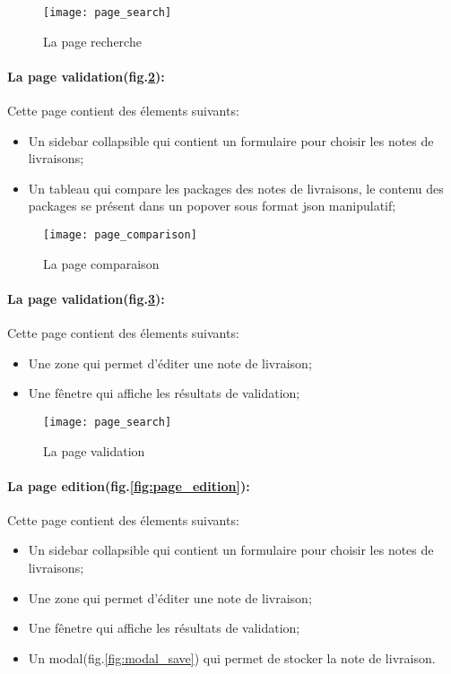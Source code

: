 \begin{figure}[h]
\centering
\texttt{[image: page\_search]}
\caption{La page recherche}
\label{fig:page_search}
\end{figure}

\paragraph{La page validation(fig.\ref{fig:page_comparaison}): } Cette page contient des élements suivants:
\begin{itemize}
  \item Un sidebar collapsible qui contient un formulaire pour choisir les notes de livraisons;
  \item Un tableau qui compare les packages des notes de livraisons, le contenu des packages se présent dans un popover sous format json manipulatif;
\end{itemize}

\begin{figure}[h]
\centering
\texttt{[image: page\_comparison]}
\caption{La page comparaison}
\label{fig:page_comparaison}
\end{figure}

\paragraph{La page validation(fig.\ref{fig:page_validation}): } Cette page contient des élements suivants:
\begin{itemize}
  \item Une zone qui permet d'éditer une note de livraison;
  \item Une fênetre qui affiche les résultats de validation;
\end{itemize}

\begin{figure}[h]
\centering
\texttt{[image: page\_search]}
\caption{La page validation}
\label{fig:page_validation}
\end{figure}

\paragraph{La page edition(fig.\ref{fig:page_edition}): } Cette page contient des élements suivants:
\begin{itemize}
  \item Un sidebar collapsible qui contient un formulaire pour choisir les notes de livraisons;
  \item Une zone qui permet d'éditer une note de livraison;
  \item Une fênetre qui affiche les résultats de validation;
  \item Un modal(fig.\ref{fig:modal_save}) qui permet de stocker la note de livraison.
\end{itemize}

